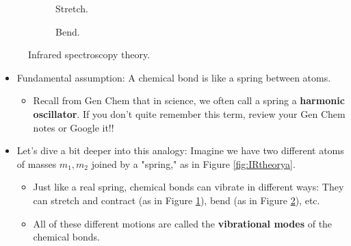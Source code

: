 \documentclass[../notes.tex]{subfiles}
\begin{document}
\begin{itemize}
\begin{figure}[h!]
\begin{subfigure}[b]{0.25\linewidth}
            \caption{Stretch.}
            \label{fig:IRtheoryb}
        \end{subfigure}
        \begin{subfigure}[b]{0.25\linewidth}
            \centering
            \caption{Bend.}
            \label{fig:IRtheoryc}
        \end{subfigure}
        \caption{Infrared spectroscopy theory.}
        \label{fig:IRtheory}
    \end{figure}
    \begin{itemize}
        \item Fundamental assumption: A chemical bond is like a spring between atoms.
        \begin{itemize}
            \item Recall from Gen Chem that in science, we often call a spring a \textbf{harmonic oscillator}. If you don't quite remember this term, review your Gen Chem notes or Google it!!
        \end{itemize}
        \item Let's dive a bit deeper into this analogy: Imagine we have two different atoms of masses $m_1,m_2$ joined by a "spring," as in Figure \ref{fig:IRtheorya}.
        \begin{itemize}
            \item Just like a real spring, chemical bonds can vibrate in different ways: They can stretch and contract (as in Figure \ref{fig:IRtheoryb}), bend (as in Figure \ref{fig:IRtheoryc}), etc.
            \item All of these different motions are called the \textbf{vibrational modes} of the chemical bonds.

\end{itemize}
\end{itemize}
\end{itemize}
\end{document}
